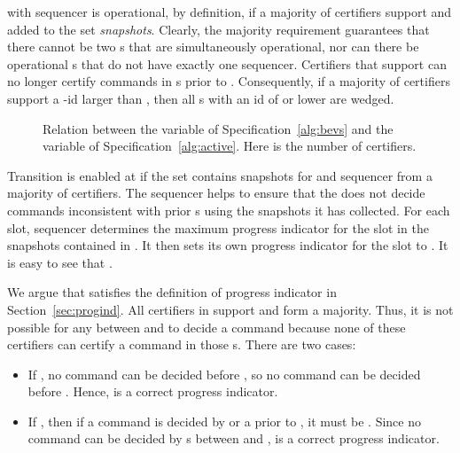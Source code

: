 {\Round}  with sequencer  is operational,
by definition, if a majority of certifiers support  and added
 to the set \textit{snapshots}.
Clearly, the majority requirement guarantees that there cannot be two
{\round}s that are simultaneously operational, nor can there be operational
{\round}s that do not have exactly one sequencer.
Certifiers that support  can no longer certify commands
in {\round}s prior to .
Consequently, if a majority of certifiers support a {\round}-id
larger than , then all {\round}s with an id of  or lower
are wedged.

\begin{figure*}
\begin{center}

\end{center}

\caption{\label{fig:refine} {\small Relation between the 
variable of Specification~\ref{alg:bevs} and the
 variable of Specification~\ref{alg:active}.
Here  is the number of certifiers.}}

\end{figure*}

\begin{comment}
With \multiconsensus, the coordinator
of a {\round} is also its sequencer.  We shall see that this is not the case with VSR (Section~\ref{sec:implementation}).
\end{comment}


Transition 
is enabled at  if
the set  contains snapshots for  and sequencer 
from a majority of certifiers.
The sequencer
helps to ensure that the {\round} does not
decide commands inconsistent with prior {\round}s using the snapshots
it has collected.
For each slot, sequencer  determines the maximum
progress indicator  for the slot in the
snapshots contained in .  It then sets its own progress
indicator for the slot to .
It is easy to see that .

We argue that  satisfies the definition
of progress indicator in Section~\ref{sec:progind}.  All certifiers
in  support  and form a majority.  Thus, it is not
possible for any {\round} between  and  to decide a command
because none of these certifiers can certify a command in those
{\round}s.  There are two cases:

\begin{itemize}\item If , no command can be
decided before , so no command can be decided before .
Hence,  is a correct progress indicator.
\item If , then if a command is decided by
 or a {\round} prior to , it must be .
Since no command can be decided by {\round}s between  and ,
 is a correct progress indicator.
\end{itemize}



